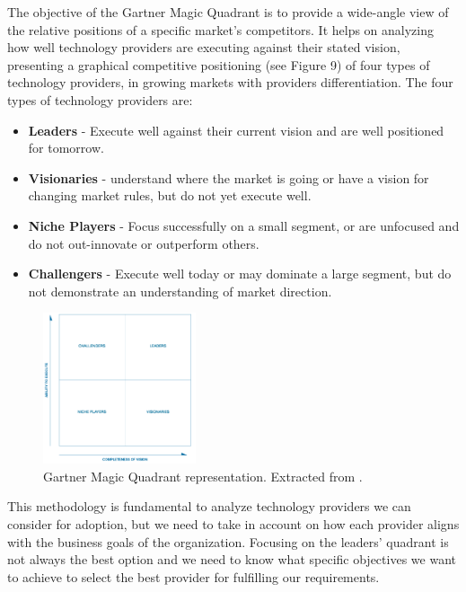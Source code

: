 The objective of the Gartner Magic Quadrant\cite{GartnerMagicQuadrant} is to provide a wide-angle view of the relative positions of a specific market's competitors. It helps on analyzing how well technology providers are executing against their stated vision, presenting a graphical competitive positioning (see Figure 9) of four types of technology providers, in growing markets with providers differentiation. The four types of technology providers are:

\begin{itemize}
\item \textbf{Leaders} - Execute well against their current vision and are well positioned for tomorrow.
\item \textbf{Visionaries} - understand where the market is going or have a vision for changing market rules, but do not yet execute well.
\item \textbf{Niche Players} - Focus successfully on a small segment, or are unfocused and do not out-innovate or outperform others.
\item \textbf{Challengers} - Execute well today or may dominate a large segment, but do not demonstrate an understanding of market direction.
\end{itemize}

\begin{figure}
\centering
\includegraphics[width=0.4\textwidth]{img/GartnerMagicQuadrant.png}
\caption{Gartner Magic Quadrant representation. Extracted from \cite{GartnerMagicQuadrant}.}
\end{figure}

This methodology is fundamental to analyze technology providers we can consider for adoption, but we need to take in account on how each provider aligns with the business goals of the organization. Focusing on the leaders' quadrant is not always the best option and we need to know what specific objectives we want to achieve to select the best provider for fulfilling our requirements. 



